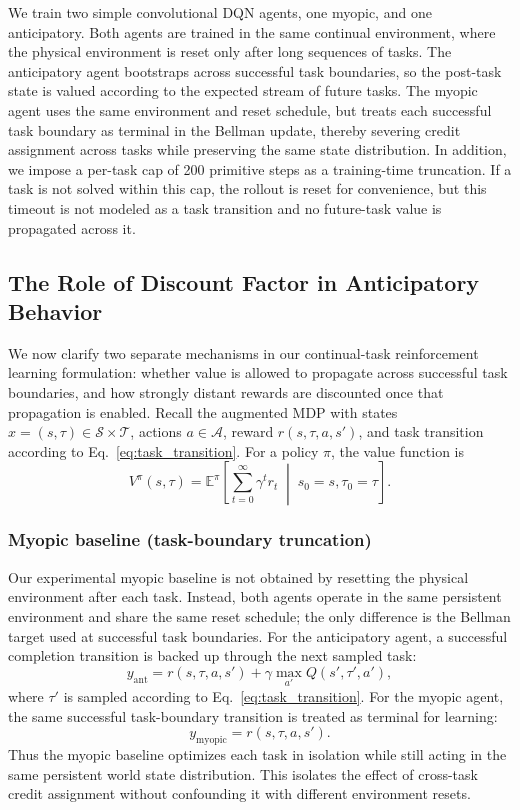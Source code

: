 \documentclass[10pt]{article} %
\begin{document}
We train two simple convolutional DQN agents, one myopic, and one anticipatory. 
Both agents are trained in the same continual environment, where the physical environment is reset only after long sequences of tasks. The anticipatory agent bootstraps across successful task boundaries, so the post-task state is valued according to the expected stream of future tasks. The myopic agent uses the same environment and reset schedule, but treats each successful task boundary as terminal in the Bellman update, thereby severing credit assignment across tasks while preserving the same state distribution.
In addition, we impose a per-task cap of 200 primitive steps as a training-time truncation. If a task is not solved within this cap, the rollout is reset for convenience, but this timeout is not modeled as a task transition and no future-task value is propagated across it.

\subsection{The Role of Discount Factor in Anticipatory Behavior}
\label{sec:gamma-proof}

We now clarify two separate mechanisms in our continual-task reinforcement learning formulation: whether value is allowed to propagate across successful task boundaries, and how strongly distant rewards are discounted once that propagation is enabled.
Recall the augmented MDP with states $x = (s,\tau) \in \mathcal{S}\times\mathcal{T}$, actions $a\in\mathcal{A}$, reward $r(s,\tau,a,s')$, and task transition according to Eq.~\eqref{eq:task_transition}.  
For a policy $\pi$, the value function is
\[
V^{\pi}(s,\tau) = \mathbb{E}^{\pi}\!\left[\sum_{t=0}^{\infty}\gamma^{t} r_t \;\middle|\; s_0=s,\tau_0=\tau\right].
\]

\subsubsection*{Myopic baseline (task-boundary truncation)}
Our experimental myopic baseline is not obtained by resetting the physical environment after each task. Instead, both agents operate in the same persistent environment and share the same reset schedule; the only difference is the Bellman target used at successful task boundaries.
For the anticipatory agent, a successful completion transition is backed up through the next sampled task:
\[
y_{\text{ant}} = r(s,\tau,a,s') + \gamma \max_{a'} Q(s',\tau',a'),
\]
where $\tau'$ is sampled according to Eq.~\eqref{eq:task_transition}. For the myopic agent, the same successful task-boundary transition is treated as terminal for learning:
\[
y_{\text{myopic}} = r(s,\tau,a,s').
\]
Thus the myopic baseline optimizes each task in isolation while still acting in the same persistent world state distribution. This isolates the effect of cross-task credit assignment without confounding it with different environment resets.
\end{document}
